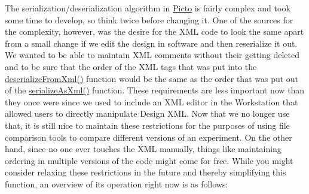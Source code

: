 The serialization/deserialization algorithm in \hyperlink{namespace_picto}{Picto} is fairly complex and took some time to develop, so think twice before changing it. One of the sources for the complexity, however, was the desire for the X\-M\-L code to look the same apart from a small change if we edit the design in software and then reserialize it out. We wanted to be able to maintain X\-M\-L comments without their getting deleted and to be sure that the order of the X\-M\-L tags that was put into the \hyperlink{class_picto_1_1_data_store_a37bb8f90b4d8c2e12970a276e6a6ec91}{deserialize\-From\-Xml()} function would be the same as the order that was put out of the \hyperlink{class_picto_1_1_data_store_a691063f5662f5db9c48deabc0f2e972b}{serialize\-As\-Xml()} function. These requirements are less important now than they once were since we used to include an X\-M\-L editor in the Workstation that allowed users to directly manipulate Design X\-M\-L. Now that we no longer use that, it is still nice to maintain these restrictions for the purposes of using file comparison tools to compare different versions of an experiment. On the other hand, since no one ever touches the X\-M\-L manually, things like maintaining ordering in multiple versions of the code might come for free. While you might consider relaxing these restrictions in the future and thereby simplifying this function, an overview of its operation right now is as follows\-:
